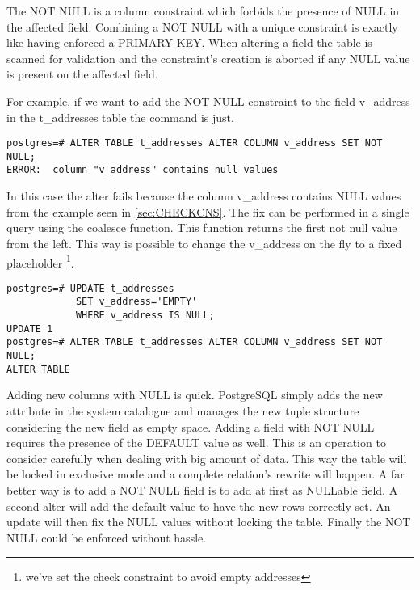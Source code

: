 The NOT NULL is a column constraint which forbids the presence of NULL in the affected field. 
Combining a NOT NULL with a unique constraint is exactly like having enforced a PRIMARY KEY. When 
altering a field the table is scanned for validation and the constraint's creation is aborted if 
any NULL value is present on the affected field.\newline

For example, if we want to add the NOT NULL constraint to the field v\_address in the t\_addresses 
table the command is just.

\begin{lstlisting}[style=pgsql]
postgres=# ALTER TABLE t_addresses ALTER COLUMN v_address SET NOT NULL;
ERROR:  column "v_address" contains null values

\end{lstlisting}

In this case the alter fails because the column v\_address contains NULL values from the example 
seen in \ref{sec:CHECKCNS}. The fix can be performed in a single query using the coalesce function.
This function returns the first not null value from the left. This way is possible to change the 
v\_address on the fly to a fixed placeholder \footnote{we've set the check constraint to avoid empty 
addresses}.

\begin{lstlisting}[style=pgsql]
postgres=# UPDATE t_addresses
            SET v_address='EMPTY'
            WHERE v_address IS NULL;
UPDATE 1
postgres=# ALTER TABLE t_addresses ALTER COLUMN v_address SET NOT NULL;
ALTER TABLE

\end{lstlisting}

Adding new columns with NULL is quick. PostgreSQL simply adds the new attribute in the system 
catalogue and manages the new tuple structure considering the new field as empty space. Adding 
a field with NOT NULL requires the presence of the DEFAULT value as well. This is an operation to 
consider carefully when dealing with big amount of data. This way the table will be locked in 
exclusive mode and a complete relation's rewrite will happen. A far better way is to add a NOT NULL 
field is to add at first as NULLable field. A second alter will add the default value to have the 
new rows correctly set. An update will then fix the NULL values without locking the 
table. Finally the NOT NULL could be enforced without hassle.